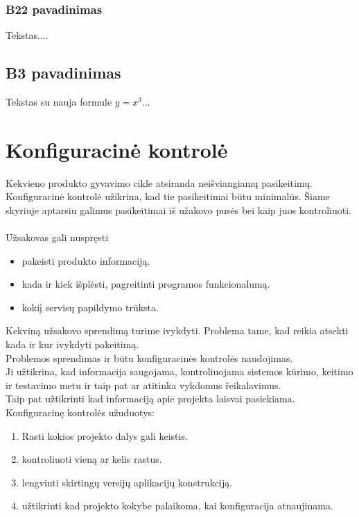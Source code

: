 \documentclass[a4paper,12pt]{article}
\begin{document}
  \subsubsection{B22 pavadinimas}
  Tekstas....
 \subsection{B3 pavadinimas}
 Tekstas su nauja formule $y=x^3$...
\clearpage 



\section{Konfiguracin\. e kontrol\. e}
Kekvieno produkto gyvavimo cikle atsiranda nei\v sviangiam\k u pasikeitim\k u.\\
Konfiguracin\. e kontrol\. e u\v zikrina, kad tie pasikeitimai b\= utu minimal\= us.
\v Siame skyriuje aptarsiu galimus pasikeitimai i\v s u\v zakovo pus\. es bei kaip juos kontroliuoti. \\
\\
U\v zsakovas gali nuspr\k esti
\begin{itemize}
	\item pakeisti produkto informacij\k a.
	\item kada ir kiek i\v spl\. esti, pagreitinti programos funkcionalum\k a.
	\item koki\k i servis\k u papildymo tr\= uksta.
\end{itemize}

Kekvin\k a u\v zsakovo sprendim\k a turime ivykdyti. Problema tame, kad reikia atsekti kada ir kur ivykdyti pakeitim\k a.\\
Problemos sprendimas ir b\= utu konfiguracin\. es kontrol\. es naudojimas.\\
Ji u\v ztikrina, kad informacija saugojama, kontroliuojama sistemos k\= urimo, keitimo ir testavimo metu ir taip pat ar atitinka vykdomus \v reikalavimus. \\
Taip pat u\v ztikrinti kad informacij\k a apie projekta laisvai pasiekiama.\\

Konfiguracin\k e kontrol\. es u\v zuduotys:
\begin{enumerate}
	\item Rasti kokios projekto dalys gali keistis.
	\item kontroliuoti vien\k a ar kelis rastus.
	\item lengvinti skirting\k u versij\k u aplikacij\k u konstrukcij\k a. 
	\item u\v ztikrinti kad projekto kokybe palaikoma, kai konfiguracija atnaujinama.
\end{enumerate}
\end{document}
